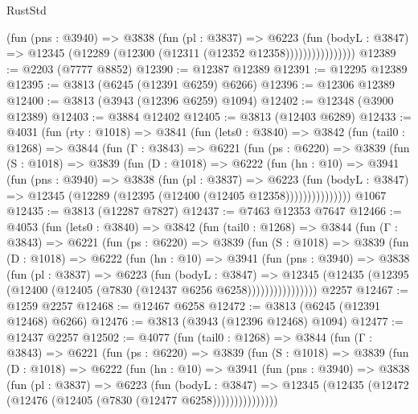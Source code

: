\begin{lexlean}{RustStd}
\begin{coremodule}
                      (fun (pns : @3940) =>
                      @3838
                        (fun (pl : @3837) =>
                        @6223
                          (fun (bodyL : @3847) =>
                          @12345 (@12289 (@12300 (@12311 (@12352 @12358))))))))))))))))
@12389 := @2203 (@7777 @8852)
@12390 := @12387 @12389
@12391 := @12295 @12389
@12395 := @3813 (@6245 (@12391 @6259) @6266)
@12396 := @12306 @12389
@12400 := @3813 (@3943 (@12396 @6259) @1094)
@12402 := @12348 (@3900 @12389)
@12403 := @3884 @12402
@12405 := @3813 (@12403 @6289)
@12433 := @4031
    (fun (rty : @1018) =>
    @3841
      (fun (lets0 : @3840) =>
      @3842
        (fun (tail0 : @1268) =>
        @3844
          (fun (Γ : @3843) =>
          @6221
            (fun (ps : @6220) =>
            @3839
              (fun (S : @1018) =>
              @3839
                (fun (D : @1018) =>
                @6222
                  (fun (hn : @10) =>
                  @3941
                    (fun (pns : @3940) =>
                    @3838
                      (fun (pl : @3837) =>
                      @6223
                        (fun (bodyL : @3847) =>
                        @12345 (@12289 (@12395 (@12400 (@12405 @12358)))))))))))))))
    @1067
@12435 := @3813 (@12287 @7827)
@12437 := @7463 @12353 @7647
@12466 := @4053
    (fun (lets0 : @3840) =>
    @3842
      (fun (tail0 : @1268) =>
      @3844
        (fun (Γ : @3843) =>
        @6221
          (fun (ps : @6220) =>
          @3839
            (fun (S : @1018) =>
            @3839
              (fun (D : @1018) =>
              @6222
                (fun (hn : @10) =>
                @3941
                  (fun (pns : @3940) =>
                  @3838
                    (fun (pl : @3837) =>
                    @6223
                      (fun (bodyL : @3847) =>
                      @12345
                        (@12435 (@12395 (@12400 (@12405 (@7830 (@12437 @6256 @6258))))))))))))))))
    @2257
@12467 := @1259 @2257
@12468 := @12467 @6258
@12472 := @3813 (@6245 (@12391 @12468) @6266)
@12476 := @3813 (@3943 (@12396 @12468) @1094)
@12477 := @12437 @2257
@12502 := @4077
    (fun (tail0 : @1268) =>
    @3844
      (fun (Γ : @3843) =>
      @6221
        (fun (ps : @6220) =>
        @3839
          (fun (S : @1018) =>
          @3839
            (fun (D : @1018) =>
            @6222
              (fun (hn : @10) =>
              @3941
                (fun (pns : @3940) =>
                @3838
                  (fun (pl : @3837) =>
                  @6223
                    (fun (bodyL : @3847) =>
                    @12345 (@12435 (@12472 (@12476 (@12405 (@7830 (@12477 @6258)))))))))))))))

\end{coremodule}
\end{lexlean}
